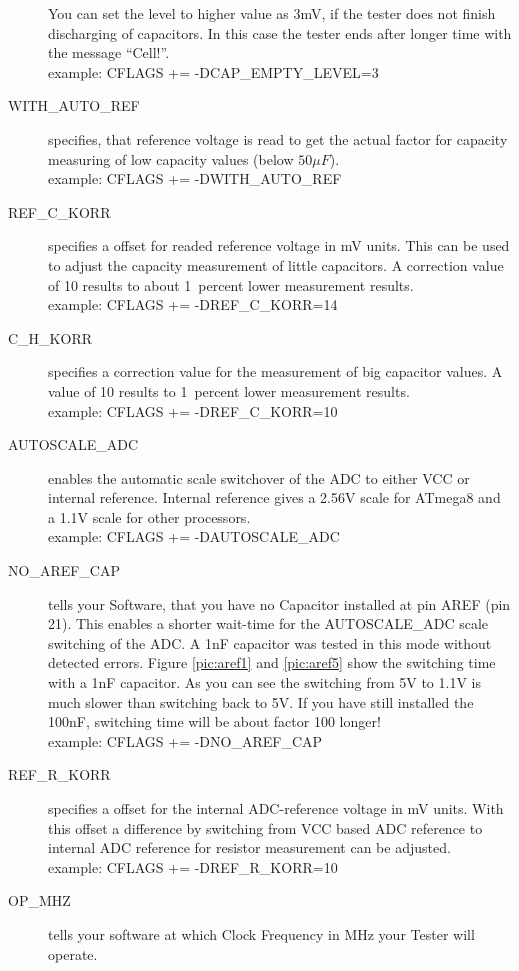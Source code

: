 \begin{description}
You can set the level to higher value as 3mV, if the tester does not finish discharging of capacitors.
In this case the tester ends after longer time with the message ``Cell!''.\\
example: CFLAGS += -DCAP\_EMPTY\_LEVEL=3
  \item[WITH\_AUTO\_REF] specifies, that reference voltage is read to get the actual factor for capacity measuring of low capacity values (below \(50\mu F\)).\\
example:  CFLAGS += -DWITH\_AUTO\_REF
  \item[REF\_C\_KORR] specifies a offset for readed reference voltage in mV units.
This can be used to adjust the capacity measurement of little capacitors.
A correction value of 10 results to about 1~percent lower measurement results.\\
example:  CFLAGS += -DREF\_C\_KORR=14
  \item[C\_H\_KORR] specifies a correction value for the measurement of big capacitor values.
A value of 10 results to 1~percent lower measurement results.\\
example:  CFLAGS += -DREF\_C\_KORR=10
  \item[AUTOSCALE\_ADC] enables the automatic scale switchover of the ADC to either VCC or internal reference.
Internal reference gives a 2.56V scale for ATmega8 and a 1.1V scale for other processors.\\
example: CFLAGS += -DAUTOSCALE\_ADC
  \item[NO\_AREF\_CAP] tells your Software, that you have no Capacitor installed at pin AREF (pin 21).
This enables a shorter wait-time for the AUTOSCALE\_ADC scale switching of the ADC.
A 1nF capacitor was tested in this mode without detected errors.
Figure \ref{pic:aref1} and \ref{pic:aref5} show the switching time with a 1nF capacitor.
As you can see the switching from 5V to 1.1V is much slower than switching back to 5V. If you
have still installed the 100nF, switching time will be about factor 100 longer!\\
example: CFLAGS += -DNO\_AREF\_CAP
  \item[REF\_R\_KORR] specifies a offset for the internal ADC-reference voltage in mV units.
With this offset a difference by switching from VCC based ADC reference to internal ADC reference for resistor measurement can be adjusted.\\
example: CFLAGS += -DREF\_R\_KORR=10
  \item[OP\_MHZ] tells your software at which Clock Frequency in MHz your Tester will operate.

\end{description}
